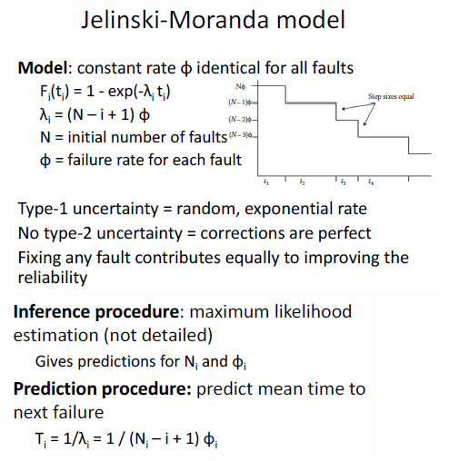 \documentclass{article}
\begin{document}
\begin{multicols}{2}
\begin{center}
    \includegraphics[scale=0.55]{image/41.PNG}
\includegraphics[scale=0.55]{image/42.PNG}
\end{center}

\end{multicols}
\end{document}
